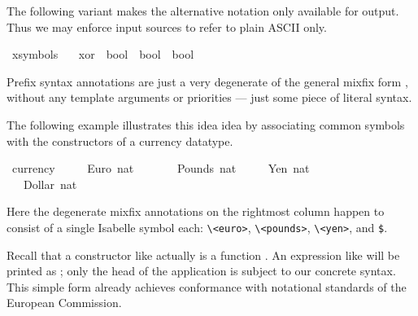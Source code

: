 \begin{isabellebody}
\begin{isamarkuptext}
  \medskip The following variant makes the alternative \isa{{\isasymoplus}}
  notation only available for output.  Thus we may enforce input
  sources to refer to plain ASCII only.%
\end{isamarkuptext}%
\isamarkuptrue%
\ {\isacharparenleft}xsymbols\ \isanewline
\ \ xor\ {\isacharcolon}{\isacharcolon}\ {\isachardoublequote}bool\ {\isasymRightarrow}\ bool\ {\isasymRightarrow}\ bool{\isachardoublequote}\ \ \ \ {\isacharparenleft}\ {\isachardoublequote}{\isasymoplus}{\isasymignore}{\isachardoublequote}\ {}{}{\isacharparenright}\isamarkupfalse%
%
\isamarkuptrue%
%
\begin{isamarkuptext}%
Prefix syntax annotations are just a very
  degenerate of the general mixfix form \cite{isabelle-ref}, without
  any template arguments or priorities --- just some piece of literal
  syntax.

  The following example illustrates this idea idea by associating
  common symbols with the constructors of a currency datatype.%
\end{isamarkuptext}%
\isamarkuptrue%
\ currency\ {\isacharequal}\isanewline
\ \ \ \ Euro\ nat\ \ \ \ {\isacharparenleft}{\isachardoublequote}{\isasymeuro}{\isachardoublequote}{\isacharparenright}\isanewline
\ \ {\isacharbar}\ Pounds\ nat\ \ {\isacharparenleft}{\isachardoublequote}{\isasympounds}{\isachardoublequote}{\isacharparenright}\isanewline
\ \ {\isacharbar}\ Yen\ nat\ \ \ \ \ {\isacharparenleft}{\isachardoublequote}{\isasymyen}{\isachardoublequote}{\isacharparenright}\isanewline
\ \ {\isacharbar}\ Dollar\ nat\ \ {\isacharparenleft}{\isachardoublequote}{\isachardollar}{\isachardoublequote}{\isacharparenright}\isamarkupfalse%
%
\begin{isamarkuptext}%
\noindent Here the degenerate mixfix annotations on the rightmost
  column happen to consist of a single Isabelle symbol each:
  \verb,\,\verb,<euro>,, \verb,\,\verb,<pounds>,,
  \verb,\,\verb,<yen>,, and \verb,$,.

  Recall that a constructor like  actually is a function
  .  An expression like  will
  be printed as ; only the head of the application is
  subject to our concrete syntax.  This simple form already achieves
  conformance with notational standards of the European Commission.


\end{isamarkuptext}
\end{isabellebody}
